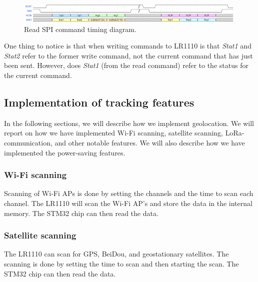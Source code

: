 \begin{figure}[H]
    \centering
    \includegraphics[width=1\textwidth]{figures/read_command.png}
    \caption{Read SPI command timing diagram.}
    \label{fig:read_command}
\end{figure}

One thing to notice is that when writing commands to LR1110 is that \textit{Stat1} and \textit{Stat2} refer to the former write command, not the current command that has just been sent. However, does \textit{Stat1} (from the read command) refer to the status for the current command.

\subsection{Implementation of tracking features}
In the following sections, we will describe how we implement geolocation. We will report on how we have implemented Wi-Fi scanning, satellite scanning, \ac{LoRa}-communication, and other notable features. We will also describe how we have implemented the power-saving features.

\subsubsection{Wi-Fi scanning}
Scanning of Wi-Fi \ac{AP}s is done by setting the channels and the time to scan each channel. The LR1110 will scan the Wi-Fi \ac{AP}'s and store the data in the internal memory. The STM32 chip can then read the data.

\subsubsection{Satellite scanning}
The LR1110 can scan for \ac{GPS}, BeiDou, and geostationary satellites. The scanning is done by setting the time to scan and then starting the scan. The STM32 chip can then read the data.

